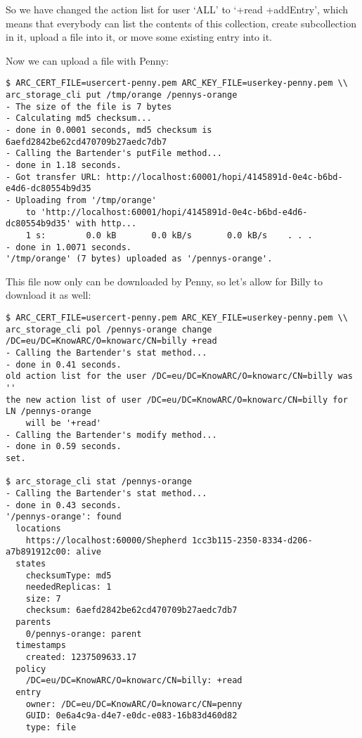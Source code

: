 \documentclass{book}
\begin{document}
So we have changed the action list for user `ALL' to `+read +addEntry', which means that everybody can list the contents of this collection, create subcollection in it, upload a file into it, or move some existing entry into it.

Now we can upload a file with Penny:

\begin{verbatim}
$ ARC_CERT_FILE=usercert-penny.pem ARC_KEY_FILE=userkey-penny.pem \\
arc_storage_cli put /tmp/orange /pennys-orange
- The size of the file is 7 bytes
- Calculating md5 checksum...
- done in 0.0001 seconds, md5 checksum is 6aefd2842be62cd470709b27aedc7db7
- Calling the Bartender's putFile method...
- done in 1.18 seconds.
- Got transfer URL: http://localhost:60001/hopi/4145891d-0e4c-b6bd-e4d6-dc80554b9d35
- Uploading from '/tmp/orange'
    to 'http://localhost:60001/hopi/4145891d-0e4c-b6bd-e4d6-dc80554b9d35' with http...
    1 s:        0.0 kB       0.0 kB/s       0.0 kB/s    . . .       
- done in 1.0071 seconds.
'/tmp/orange' (7 bytes) uploaded as '/pennys-orange'.
\end{verbatim}

This file now only can be downloaded by Penny, so let's allow for Billy to download it as well:

\begin{verbatim}
$ ARC_CERT_FILE=usercert-penny.pem ARC_KEY_FILE=userkey-penny.pem \\
arc_storage_cli pol /pennys-orange change /DC=eu/DC=KnowARC/O=knowarc/CN=billy +read
- Calling the Bartender's stat method...
- done in 0.41 seconds.
old action list for the user /DC=eu/DC=KnowARC/O=knowarc/CN=billy was ''
the new action list of user /DC=eu/DC=KnowARC/O=knowarc/CN=billy for LN /pennys-orange
    will be '+read'
- Calling the Bartender's modify method...
- done in 0.59 seconds.
set.

$ arc_storage_cli stat /pennys-orange
- Calling the Bartender's stat method...
- done in 0.43 seconds.
'/pennys-orange': found
  locations
    https://localhost:60000/Shepherd 1cc3b115-2350-8334-d206-a7b891912c00: alive
  states
    checksumType: md5
    neededReplicas: 1
    size: 7
    checksum: 6aefd2842be62cd470709b27aedc7db7
  parents
    0/pennys-orange: parent
  timestamps
    created: 1237509633.17
  policy
    /DC=eu/DC=KnowARC/O=knowarc/CN=billy: +read
  entry
    owner: /DC=eu/DC=KnowARC/O=knowarc/CN=penny
    GUID: 0e6a4c9a-d4e7-e0dc-e083-16b83d460d82
    type: file
\end{verbatim}
\end{document}
